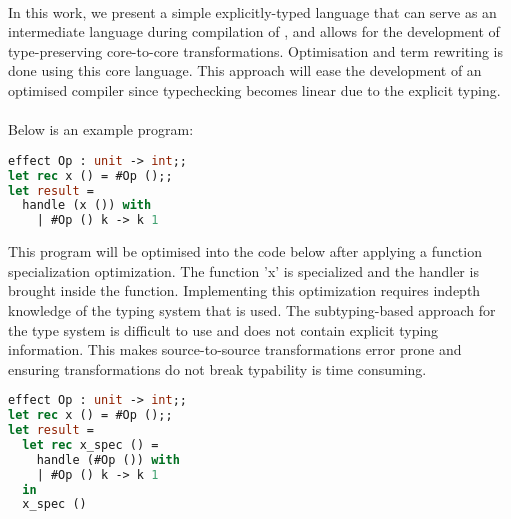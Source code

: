 \\
In this work, we present a simple explicitly-typed language that can serve as an intermediate language during compilation of \eff, and allows for the development of type-preserving core-to-core transformations. Optimisation and term rewriting is done using this core language. This approach will ease the development of an optimised compiler since typechecking becomes linear due to the explicit typing.\\
\\
Below is an example program:
\begin{lstlisting}[language=Caml]
effect Op : unit -> int;;
let rec x () = #Op ();;
let result =
  handle (x ()) with
    | #Op () k -> k 1
\end{lstlisting}
This program will be optimised into the code below after applying a function specialization optimization. The function 'x' is specialized and the handler is brought inside the function. Implementing this optimization requires indepth knowledge of the typing system that is used. The subtyping-based approach for the type system is difficult to use and does not contain explicit typing information. This makes source-to-source transformations error prone and
ensuring transformations do not break typability is time consuming.

\begin{lstlisting}[language=Caml]
effect Op : unit -> int;;
let rec x () = #Op ();;
let result =
  let rec x_spec () =
    handle (#Op ()) with
    | #Op () k -> k 1
  in
  x_spec ()
\end{lstlisting}

